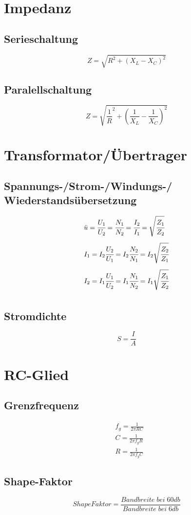 \documentclass[12pt,a5paper,ngerman,titlepage]{article}
\begin{document}
\section{Impedanz}
\subsection{Serieschaltung}
$$Z=\sqrt{R^2+(X_{L}-X_{C})^2}$$

\subsection{Paralellschaltung}
$$Z=\sqrt{\frac{1}{R}^2+\left(\frac{1}{X_{L}}-\frac{1}{X_{C}}\right)^2}$$
\newpage
\section{Transformator/Übertrager}
\subsection{Spannungs-/Strom-/Windungs-/ Wiederstandsübersetzung}
\begin{align*}
&\ddot{u}=\cfrac{U_{1}}{U_{2}}=\cfrac{N_{1}}{N_{2}}=\cfrac{I_{2}}{I_{1}} =\sqrt{\cfrac{Z_{1}}{Z_{2}}} \\[5pt]
&I_{1}=I_{2}\cfrac{U_{2}}{U_{1}} = I_{2}\cfrac{N_{2}}{N_{1}} =I_{2}\sqrt{\cfrac{Z_{2}}{Z_{1}}}\\[5pt]
&I_{2}=I_{1}\cfrac{U_{1}}{U_{2}} = I_{1}\cfrac{N_{1}}{N_{2}} =I_{1}\sqrt{\cfrac{Z_{1}}{Z_{2}}}\\[5pt]
\end{align*}
\subsection{Stromdichte}
$$S=\frac{I}{A}$$
\newpage
\section{RC-Glied}
\subsection{Grenzfrequenz}
\begin{align*}
&f_{g}=\frac{1}{2\pi RC} \\[5pt]
&C =\frac{1}{2\pi f_{g}R} \\[5pt]
&R =\frac{1}{2\pi f_{g}C}
\end{align*}

\subsection{Shape-Faktor}
$$ShapeFaktor=\frac{Bandbreite \; bei \;60db}{Bandbreite \; bei \; 6db}$$
\newpage
\end{document}
